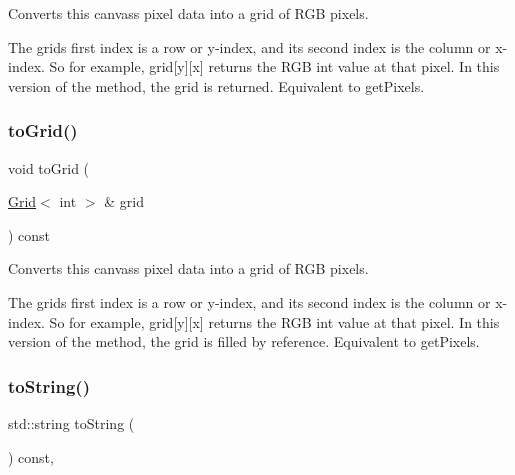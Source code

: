 Converts this canvas\textquotesingle{}s pixel data into a grid of R\+GB pixels. 

The grid\textquotesingle{}s first index is a row or y-\/index, and its second index is the column or x-\/index. So for example, grid\mbox{[}y\mbox{]}\mbox{[}x\mbox{]} returns the R\+GB int value at that pixel. In this version of the method, the grid is returned. Equivalent to get\+Pixels. \mbox{\label{classGCanvas_a11c06bec679dda1519ed914bca68900a}} 
\subsubsection{\texorpdfstring{to\+Grid()}{toGrid()}\hspace{0.1cm}{\footnotesize\ttfamily [2/2]}}
{\footnotesize\ttfamily void to\+Grid (\begin{DoxyParamCaption}\item[{\mbox{\hyperlink{classGrid}{Grid}}$<$ int $>$ \&}]{grid }\end{DoxyParamCaption}) const\hspace{0.3cm}{\ttfamily [virtual]}}



Converts this canvas\textquotesingle{}s pixel data into a grid of R\+GB pixels. 

The grid\textquotesingle{}s first index is a row or y-\/index, and its second index is the column or x-\/index. So for example, grid\mbox{[}y\mbox{]}\mbox{[}x\mbox{]} returns the R\+GB int value at that pixel. In this version of the method, the grid is filled by reference. Equivalent to get\+Pixels. \mbox{\label{classGObservable_a1fe5121d6528fdea3f243321b3fa3a49}} 
\subsubsection{\texorpdfstring{to\+String()}{toString()}}
{\footnotesize\ttfamily std\+::string to\+String (\begin{DoxyParamCaption}{ }\end{DoxyParamCaption}) const\hspace{0.3cm}{\ttfamily [virtual]}, {\ttfamily [inherited]}}



